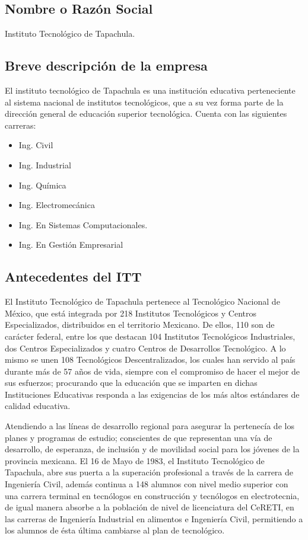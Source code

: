\subsection*{Nombre o Razón Social}
Instituto Tecnológico de Tapachula.

\subsection*{Breve descripción de la empresa}
El instituto tecnológico de Tapachula es una institución educativa perteneciente al sistema nacional de institutos tecnológicos, que a su vez forma parte de la dirección general de educación superior tecnológica. Cuenta con las siguientes carreras: 
\begin{multicols}{2}
{\setlength{\baselineskip}{0.7\baselineskip}\begin{itemize}
	\item Ing. Civil
	\item Ing. Industrial
	\item Ing. Química
	\item Ing. Electromecánica
	\item Ing. En Sistemas Computacionales.
	\item Ing. En Gestión Empresarial
\end{itemize}}
\end{multicols}

\subsection*{Antecedentes del ITT}

El Instituto Tecnológico de Tapachula pertenece al Tecnológico Nacional de México, que está integrada por 218 Institutos Tecnológicos y Centros Especializados, distribuidos en el territorio Mexicano. De ellos, 110 son de carácter federal, entre los que destacan 104 Institutos Tecnológicos Industriales, dos Centros Especializados y cuatro Centros de Desarrollos Tecnológico. A lo mismo se unen 108 Tecnológicos Descentralizados, los cuales han servido al país durante más de 57 años de vida, siempre con el compromiso de hacer el mejor de sus esfuerzos; procurando que la educación que se imparten en dichas Instituciones Educativas responda a las exigencias de los más altos estándares de calidad educativa.

Atendiendo a las líneas de desarrollo regional para asegurar la pertenecía de los planes y programas de estudio; conscientes de que representan una vía de desarrollo, de esperanza, de inclusión y de movilidad social para los jóvenes de la provincia mexicana. El 16 de Mayo de 1983, el Instituto Tecnológico de Tapachula, abre sus puerta a la superación profesional a través de la carrera de Ingeniería Civil, además continua a 148 alumnos con nivel medio superior con una carrera terminal en tecnólogos en construcción y tecnólogos en electrotecnia, de igual manera absorbe a la población de nivel de licenciatura del CeRETI, en las carreras de Ingeniería Industrial en alimentos e Ingeniería Civil, permitiendo a los alumnos de ésta última cambiarse al plan de tecnológico.

